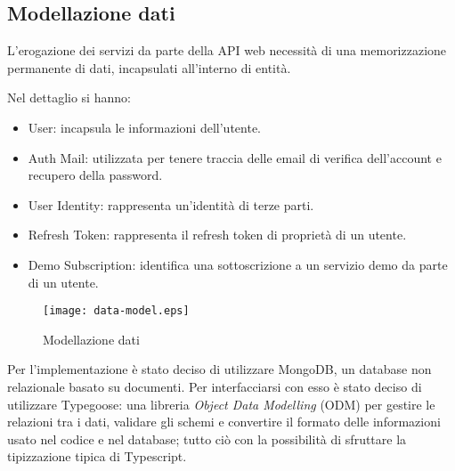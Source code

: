 \subsection{Modellazione dati}
L'erogazione dei servizi da parte della API web necessità di una memorizzazione permanente di dati, incapsulati all'interno di entità.

Nel dettaglio si hanno:
\begin{itemize}
    \itemsep0em
    \item User: incapsula le informazioni dell'utente.
    \item Auth Mail: utilizzata per tenere traccia delle email di verifica dell'account e recupero della password.
    \item User Identity: rappresenta un'identità di terze parti.
    \item Refresh Token: rappresenta il refresh token di proprietà di un utente.
    \item Demo Subscription: identifica una sottoscrizione a un servizio demo da parte di un utente.
\end{itemize}

\newpage
\begin{figure}[h]
    \centering
    \texttt{[image: data-model.eps]}
    \caption{Modellazione dati}
    \label{fig:DataModel}
\end{figure}

Per l'implementazione è stato deciso di utilizzare MongoDB, un database non relazionale basato su documenti.
Per interfacciarsi con esso è stato deciso di utilizzare Typegoose\cite{Typegoose}: una libreria \textit{Object Data Modelling} (ODM) per gestire le relazioni tra i dati,
validare gli schemi e convertire il formato delle informazioni usato nel codice e nel database; tutto ciò con la possibilità di sfruttare la tipizzazione tipica di Typescript.

